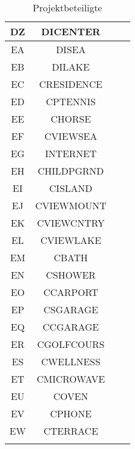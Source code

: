 \begin{longtable}{ | c | c | c | c |}
	DZ & DICENTER &  \\ \hline 
	EA & DISEA &  \\ \hline 
	EB & DILAKE &  \\ \hline 
	EC & CRESIDENCE &  \\ \hline 
	ED & CPTENNIS &  \\ \hline 
	EE & CHORSE &  \\ \hline 
	EF & CVIEWSEA &  \\ \hline 
	EG & INTERNET &  \\ \hline 
	EH & CHILDPGRND &  \\ \hline 
	EI & CISLAND &  \\ \hline 
	EJ & CVIEWMOUNT &  \\ \hline 
	EK & CVIEWCNTRY &  \\ \hline 
	EL & CVIEWLAKE &  \\ \hline 
	EM & CBATH &  \\ \hline 
	EN & CSHOWER &  \\ \hline 
	EO & CCARPORT &  \\ \hline 
	EP & CSGARAGE &  \\ \hline 
	EQ & CCGARAGE &  \\ \hline 
	ER & CGOLFCOURS &  \\ \hline 
	ES & CWELLNESS &  \\ \hline 
	ET & CMICROWAVE &  \\ \hline 
	EU & COVEN &  \\ \hline 
	EV & CPHONE &  \\ \hline 
	EW & CTERRACE &  \\ \hline 
	
	\caption{Projektbeteiligte}
\end{longtable} 

											